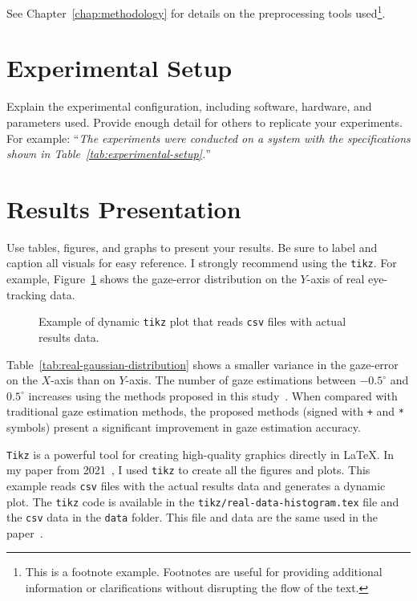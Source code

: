 See Chapter~\ref{chap:methodology} for details on the preprocessing tools used\footnote{This is a footnote example. Footnotes are useful for providing additional information or clarifications without disrupting the flow of the text.}.

\section{Experimental Setup}\label{sec:experimental-setup}
Explain the experimental configuration, including software, hardware, and parameters used. Provide enough detail for others to replicate your experiments. For example: ``\textit{The experiments were conducted on a system with the specifications shown in Table~\ref{tab:experimental-setup}.}''


\section{Results Presentation}\label{sec:results-presentation}
Use tables, figures, and graphs to present your results. Be sure to label and caption all visuals for easy reference. I strongly recommend using the \texttt{tikz}. For example, Figure~\ref{fig:real-data-histogram} shows the gaze-error distribution on the $Y$-axis of real eye-tracking data.
\begin{figure}[!ht]
    \centering
    \resizebox{\textwidth}{!}{%
        
    }
    \caption{Example of dynamic \texttt{tikz} plot that reads \texttt{csv} files with actual results data.}
    \label{fig:real-data-histogram}
\end{figure}

Table~\ref{tab:real-gaussian-distribution} shows a smaller variance in the gaze-error on the $X$-axis than on $Y$-axis. The number of gaze estimations between $-0.5^\circ$ and $0.5^\circ$ increases using the methods proposed in this study~\cite{Narcizo2021}. When compared with traditional gaze estimation methods, the proposed methods (signed with \texttt{+} and \texttt{*} symbols) present a significant improvement in gaze estimation accuracy.


\texttt{Tikz} is a powerful tool for creating high-quality graphics directly in \LaTeX. In my paper from 2021~\cite{Narcizo2021}, I used \texttt{tikz} to create all the figures and plots. This example reads \texttt{csv} files with the actual results data and generates a dynamic plot. The \texttt{tikz} code is available in the \texttt{tikz/real-data-histogram.tex} file and the \texttt{csv} data in the \texttt{data} folder. This file and data are the same used in the paper~\cite{Narcizo2021}.

